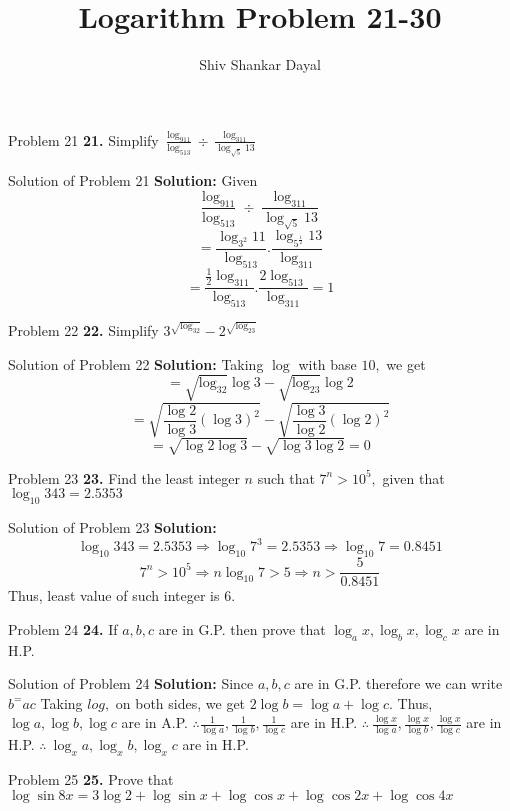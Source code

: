 \documentclass[aspectratio=1610,8pt]{beamer}
\title{Logarithm Problem 21-30}
\author[Shiv Shankar Dayal]{Shiv Shankar Dayal}
\begin{document}
\begin{frame}
  \titlepage
\end{frame}
\begin{frame}{Problem 21}
  \textbf{21.} Simplify $\frac{\log_911}{\log_513}\div\frac{\log_311}{\log_{\sqrt{5}}13}$
\end{frame}
\begin{frame}{Solution of Problem 21}
  \textbf{Solution:} Given $$\frac{\log_911}{\log_513}\div\frac{\log_311}{\log_{\sqrt{5}}13}$$
  $$= \frac{\log_{3^2}11}{\log_513}.\frac{\log_{5^{\frac{1}{2}}}13}{\log_311}$$
  $$= \frac{\frac{1}{2}\log_311}{\log_513}.\frac{2\log_513}{\log_311} = 1$$
\end{frame}
\begin{frame}{Problem 22}
  \textbf{22.} Simplify $3^{\sqrt{\log_32}} - 2^{\sqrt{\log_23}}$
\end{frame}
\begin{frame}{Solution of Problem 22}
  \textbf{Solution:} Taking $\log$ with base $10,$ we get
  $$= \sqrt{\log_32}\log 3 - \sqrt{\log_23}\log 2$$
  $$= \sqrt{\frac{\log2}{\log3}(\log 3)^2} - \sqrt{\frac{\log3}{\log2}(\log2)^2}$$
  $$=\sqrt{\log2\log3} - \sqrt{\log3\log2} = 0$$
\end{frame}
\begin{frame}{Problem 23}
  \textbf{23.} Find the least integer $n$ such that $7^n > 10^5,$ given that $\log_{10}343 = 2.5353$
\end{frame}
\begin{frame}{Solution of Problem 23}
  \textbf{Solution:} $$\log_{10}343 = 2.5353 \Rightarrow \log_{10}7^3 = 2.5353 \Rightarrow \log_{10}7 = 0.8451$$
  $$7^n > 10^5 \Rightarrow n\log_{10}7 > 5\Rightarrow n > \frac{5}{0.8451}$$
  Thus, least value of such integer is $6.$
\end{frame}
\begin{frame}{Problem 24}
  \textbf{24.} If $a,b,c$ are in G.P. then prove that $\log_ax, \log_bx,
  \log_cx$ are in H.P.
\end{frame}
\begin{frame}{Solution of Problem 24}
  \textbf{Solution:} Since $a,b,c$ are in G.P. therefore we can write $b^ = ac$
  \linebreak\linebreak
  Taking $log,$ on both sides, we get $2\log b = \log a + \log c.$
  Thus, $\log a, \log b, \log c$ are in A.P.
  \linebreak\linebreak
  $\therefore \frac{1}{\log a}, \frac{1}{\log b}, \frac{1}{\log c}$ are in H.P.
  \linebreak\linebreak
  $\therefore~ \frac{\log x}{\log a}, \frac{\log x}{\log b}, \frac{\log x}{\log c}$ are in H.P.
  \linebreak\linebreak
  $\therefore~\log_xa, \log_xb, \log_xc$ are in H.P.
\end{frame}
\begin{frame}{Problem 25}
  \textbf{25.} Prove that $\log \sin8x = 3\log2 + \log\sin x + \log\cos x + \log\cos2x + \log\cos4x$
\end{frame}
\end{document}
